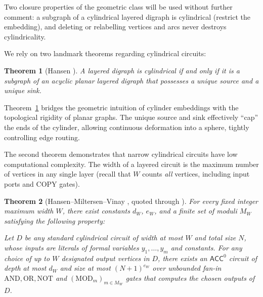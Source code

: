 \documentclass[11pt]{article}
\newtheorem{theorem}{Theorem}[section]
\theoremstyle{definition}
\theoremstyle{remark}
\newcommand{\ACC}{\mathsf{ACC}^0}
\begin{document}
Two closure properties of the geometric class will be used without further comment: a subgraph of a cylindrical layered digraph is cylindrical (restrict the embedding), and deleting or relabelling vertices and arcs never destroys cylindricality.



We rely on two landmark theorems regarding cylindrical circuits:

\begin{theorem}[{Hansen \cite[Theorem~2]{Hansen03}}]\label{thm:hansen2}
A layered digraph is cylindrical if and only if it is a subgraph of an acyclic planar layered digraph that possesses a unique source and a unique sink.
\end{theorem}

Theorem~\ref{thm:hansen2} bridges the geometric intuition of cylinder embeddings with the topological rigidity of planar graphs. The unique source and sink effectively ``cap'' the ends of the cylinder, allowing continuous deformation into a sphere, tightly controlling edge routing.

The second theorem demonstrates that narrow cylindrical circuits have low computational complexity. The width of a layered circuit is the maximum number of vertices in any single layer (recall that $W$ counts \emph{all} vertices, including input ports and $\mathrm{COPY}$ gates).

\begin{theorem}[{Hansen--Miltersen--Vinay \cite[Theorem~2]{HMV02}, quoted through \cite[Theorem~8 and Corollary~9]{Hansen03}}]\label{thm:hmv}
For every fixed integer maximum width $W$, there exist constants $d_W$, $e_W$, and a finite set of moduli $M_W$ satisfying the following property:

Let $D$ be any standard cylindrical circuit of width at most $W$ and total size $N$, whose inputs are literals of formal variables $y_1, \dots, y_m$ and constants. For any choice of up to $W$ designated output vertices in $D$, there exists an $\ACC$ circuit of depth at most $d_W$ and size at most $(N+1)^{e_W}$ over unbounded fan-in $\mathrm{AND}, \mathrm{OR}, \mathrm{NOT}$ and $(\mathrm{MOD}_m)_{m \in M_W}$ gates that computes the chosen outputs of $D$.
\end{theorem}
\end{document}
